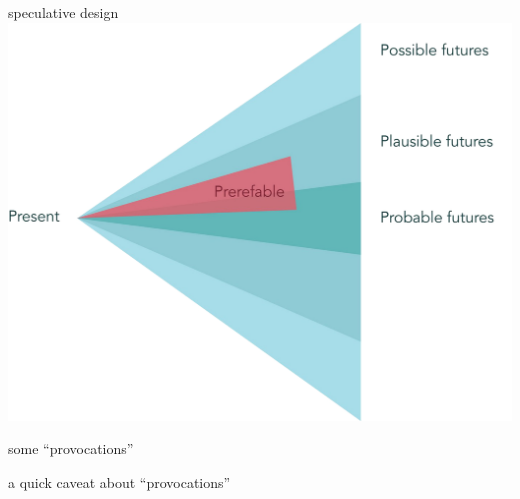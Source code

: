\documentclass[aspectratio=43,17pt]{beamer} %
\begin{document}
\begin{frame}{speculative design}
\centering
\includegraphics[height=0.9\textheight]{figures/clipart/speculative_design.png}
\end{frame}



\begin{frame}{some ``provocations''}
\end{frame}


\begin{frame}[plain]
\centering

a quick caveat about ``provocations''

\end{frame}
\end{document}
